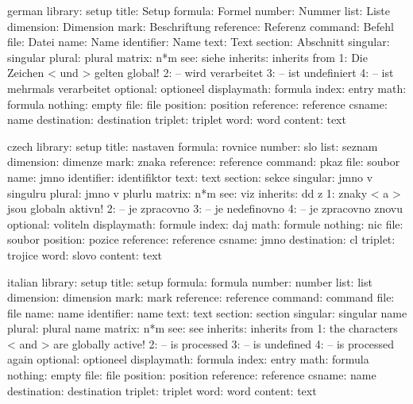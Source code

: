 \startmessages  german library: setup
        title:  Setup
      formula:  Formel
       number:  Nummer
         list:  Liste
    dimension:  Dimension
         mark:  Beschriftung
    reference:  Referenz
      command:  Befehl
         file:  Datei
         name:  Name
   identifier:  Name
         text:  Text
      section:  Abschnitt
     singular:  singular
       plural:  plural
       matrix:  n*m
          see:  siehe
     inherits:  inherits from
            1:  Die Zeichen < und > gelten global!
            2:  -- wird verarbeitet
            3:  -- ist undefiniert
            4:  -- ist mehrmals verarbeitet
     optional:  optioneel
  displaymath:  formula
        index:  entry
         math:  formula
      nothing:  empty
         file:  file
     position:  position
    reference:  reference
       csname:  name
  destination:  destination
      triplet:  triplet
         word:  word
      content:  text
\stopmessages

\startmessages  czech  library: setup
        title:  nastaven\iacute{}
      formula:  rovnice
       number:  \ccaron\iacute slo
         list:  seznam
    dimension:  dimenze
         mark:  zna\ccaron ka
    reference:  reference
      command:  p\rcaron\iacute kaz
         file:  soubor
         name:  jm\eacute no
   identifier:  identifik\aacute tor
         text:  text
      section:  sekce
     singular:  jm\eacute no v singul\aacute ru
       plural:  jm\eacute no v plur\aacute lu
       matrix:  n*m
          see:  viz
     inherits:  d\ecaron d\iacute{} z
            1:  znaky < a > jsou globaln\ecaron{} aktivn\iacute!
            2:  -- je zpracov\aacute no
            3:  -- je nedefinov\aacute no
            4:  -- je zpracov\aacute no znovu
     optional:  voliteln\eacute{}
  displaymath:  formule
        index:  \uacute daj
         math:  formule
      nothing:  nic
         file:  soubor
     position:  pozice
    reference:  reference
       csname:  jm\eacute no
  destination:  c\iacute l
      triplet:  trojice
         word:  slovo
      content:  text
\stopmessages

\startmessages  italian library: setup
        title:  setup
      formula:  formula
       number:  number
         list:  list
    dimension:  dimension
         mark:  mark
    reference:  reference
      command:  command
         file:  file
         name:  name
   identifier:  name
         text:  text
      section:  section
     singular:  singular name
       plural:  plural name
       matrix:  n*m
          see:  see
     inherits:  inherits from
            1:  the characters < and > are globally active!
            2:  -- is processed
            3:  -- is undefined
            4:  -- is processed again
     optional:  optioneel
  displaymath:  formula
        index:  entry
         math:  formula
      nothing:  empty
         file:  file
     position:  position
    reference:  reference
       csname:  name
  destination:  destination
      triplet:  triplet
         word:  word
      content:  text
\stopmessages

